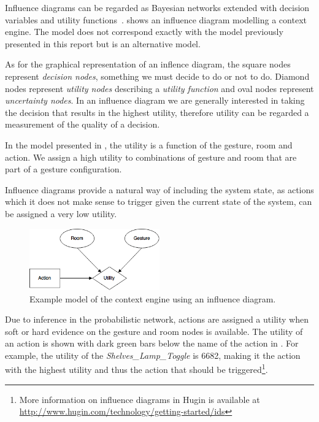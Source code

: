 Influence diagrams can be regarded as Bayesian networks extended with decision variables and utility functions~\cite{kjaerulff2008bayesian}.  shows an influence diagram modelling a context engine. The model does not correspond exactly with the model previously presented in this report but is an alternative model.

As for the graphical representation of an inflence diagram, the square nodes represent \emph{decision nodes}, \ie something we must decide to do or not to do. Diamond nodes represent \emph{utility nodes} describing a \emph{utility function} and oval nodes represent \emph{uncertainty nodes}. In an influence diagram we are generally interested in taking the decision that results in the highest utility, therefore utility can be regarded a measurement of the quality of a decision.

In the model presented in , the utility is a function of the gesture, room and action. We assign a high utility to combinations of gesture and room that are part of a gesture configuration. 

Influence diagrams provide a natural way of including the system state, as actions which it does not make sense to trigger given the current state of the system, can be assigned a very low utility.

\begin{figure}[!h]
\centering
\includegraphics[width=0.50\textwidth]{images/influence-diagram}
\caption{Example model of the context engine using an influence diagram.}
\label{fig:evaluation:alternative-models:influence-diagram}
\end{figure}

Due to inference in the probabilistic network, actions are assigned a utility when soft or hard evidence on the gesture and room nodes is available. The utility of an action is shown with dark green bars below the name of the action in . For example, the utility of the \emph{Shelves\_Lamp\_Toggle} is 6682, making it the action with the highest utility and thus the action that should be triggered\footnote{More information on influence diagrams in Hugin is available at \url{http://www.hugin.com/technology/getting-started/ids}}.


